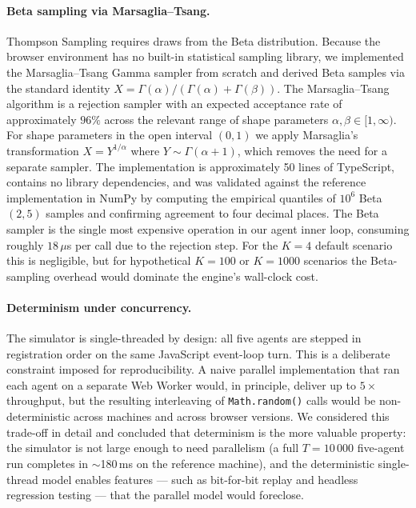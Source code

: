 \paragraph{Beta sampling via Marsaglia--Tsang.}
Thompson Sampling requires draws from the Beta distribution. Because the browser environment has no built-in statistical sampling library, we implemented the Marsaglia--Tsang Gamma sampler from scratch and derived Beta samples via the standard identity $X = \Gamma(\alpha) / (\Gamma(\alpha) + \Gamma(\beta))$. The Marsaglia--Tsang algorithm is a rejection sampler with an expected acceptance rate of approximately $96\%$ across the relevant range of shape parameters $\alpha, \beta \in [1, \infty)$. For shape parameters in the open interval $(0, 1)$ we apply Marsaglia's transformation $X = Y^{1/\alpha}$ where $Y \sim \Gamma(\alpha + 1)$, which removes the need for a separate sampler. The implementation is approximately 50 lines of TypeScript, contains no library dependencies, and was validated against the reference implementation in NumPy by computing the empirical quantiles of $10^6$ Beta$(2, 5)$ samples and confirming agreement to four decimal places. The Beta sampler is the single most expensive operation in our agent inner loop, consuming roughly $18\,\mu$s per call due to the rejection step. For the $K = 4$ default scenario this is negligible, but for hypothetical $K = 100$ or $K = 1000$ scenarios the Beta-sampling overhead would dominate the engine's wall-clock cost.

\paragraph{Determinism under concurrency.}
The simulator is single-threaded by design: all five agents are stepped in registration order on the same JavaScript event-loop turn. This is a deliberate constraint imposed for reproducibility. A naive parallel implementation that ran each agent on a separate Web Worker would, in principle, deliver up to $5\times$ throughput, but the resulting interleaving of \texttt{Math.random()} calls would be non-deterministic across machines and across browser versions. We considered this trade-off in detail and concluded that determinism is the more valuable property: the simulator is not large enough to need parallelism (a full $T = 10\,000$ five-agent run completes in $\sim$180\,ms on the reference machine), and the deterministic single-thread model enables features --- such as bit-for-bit replay and headless regression testing --- that the parallel model would foreclose.

